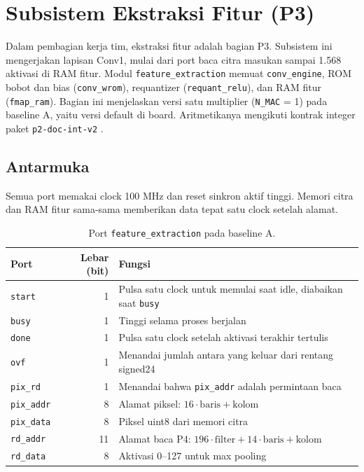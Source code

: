 \documentclass[11pt,a4paper]{article}
\begin{document}
\section{Subsistem Ekstraksi Fitur (P3)}
Dalam pembagian kerja tim, ekstraksi fitur adalah bagian P3. Subsistem ini
mengerjakan lapisan Conv1, mulai dari port baca citra masukan sampai 1.568
aktivasi di RAM fitur. Modul \texttt{feature\_extraction} memuat
\texttt{conv\_engine}, ROM bobot dan bias (\texttt{conv\_wrom}), requantizer
(\texttt{requant\_relu}), dan RAM fitur (\texttt{fmap\_ram}). Bagian ini
menjelaskan versi satu multiplier (\texttt{N\_MAC} = 1) pada baseline A,
yaitu versi default di board. Aritmetikanya mengikuti kontrak integer paket
\texttt{p2-doc-int-v2} \cite{repo}.

\subsection{Antarmuka}
Semua port memakai clock 100 MHz dan reset sinkron aktif tinggi. Memori citra
dan RAM fitur sama-sama memberikan data tepat satu clock setelah alamat.

\begin{table}[H]
\centering\small
\caption{Port \texttt{feature\_extraction} pada baseline A.}
\label{tab:p3-port}
\begin{tabularx}{\linewidth}{lrX}
\toprule
Port & Lebar (bit) & Fungsi \\
\midrule
\texttt{start} & 1 & Pulsa satu clock untuk memulai saat idle, diabaikan saat \texttt{busy} \\
\texttt{busy} & 1 & Tinggi selama proses berjalan \\
\texttt{done} & 1 & Pulsa satu clock setelah aktivasi terakhir tertulis \\
\texttt{ovf} & 1 & Menandai jumlah antara yang keluar dari rentang signed24 \\
\texttt{pix\_rd} & 1 & Menandai bahwa \texttt{pix\_addr} adalah permintaan baca \\
\texttt{pix\_addr} & 8 & Alamat piksel: \(16\cdot\mathrm{baris}+\mathrm{kolom}\) \\
\texttt{pix\_data} & 8 & Piksel uint8 dari memori citra \\
\texttt{rd\_addr} & 11 & Alamat baca P4: \(196\cdot\mathrm{filter}+14\cdot\mathrm{baris}+\mathrm{kolom}\) \\
\texttt{rd\_data} & 8 & Aktivasi 0--127 untuk max pooling \\
\bottomrule
\end{tabularx}
\end{table}
\end{document}
